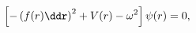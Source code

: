 \begin{equation}\label{de-hs}
\left[ - \left( f(r) \ddr \right)^2 + V(r) - \omega^2 \right] \psi(r) = 0,
\end{equation}

